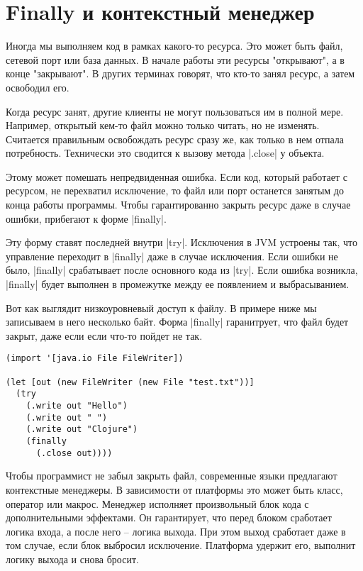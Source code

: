 \section{Finally и контекстный менеджер}

Иногда мы выполняем код в рамках какого-то ресурса. Это может быть файл, сетевой
порт или база данных. В начале работы эти ресурсы "открывают", а в конце
"закрывают". В других терминах говорят, что кто-то занял ресурс, а затем
освободил его.

Когда ресурс занят, другие клиенты не могут пользоваться им в полной
мере. Например, открытый кем-то файл можно только читать, но не
изменять. Считается правильным освобождать ресурс сразу же, как только в нем
отпала потребность. Технически это сводится к вызову метода \spverb|.close| у объекта.

Этому может помешать непредвиденная ошибка. Если код, который работает с
ресурсом, не перехватил исключение, то файл или порт останется занятым до конца
работы программы. Чтобы гарантированно закрыть ресурс даже в случае ошибки,
прибегают к форме \spverb|finally|.

Эту форму ставят последней внутри \spverb|try|. Исключения в JVM устроены так, что
управление переходит в \spverb|finally| даже в случае исключения. Если ошибки не было,
\spverb|finally| срабатывает после основного кода из \spverb|try|. Если ошибка возникла,
\spverb|finally| будет выполнен в промежутке между ее появлением и выбрасыванием.

Вот как выглядит низкоуровневый доступ к файлу. В примере ниже мы записываем в
него несколько байт. Форма \spverb|finally| гаранитрует, что файл будет закрыт, даже
если если что-то пойдет не так.

\begin{verbatim}
(import '[java.io File FileWriter])

(let [out (new FileWriter (new File "test.txt"))]
  (try
    (.write out "Hello")
    (.write out " ")
    (.write out "Clojure")
    (finally
      (.close out))))
\end{verbatim}

Чтобы программист не забыл закрыть файл, современные языки предлагают
контекстные менеджеры. В зависимости от платформы это может быть класс, оператор
или макрос. Менеджер исполняет произвольный блок кода с дополнительными
эффектами. Он гарантирует, что перед блоком сработает логика входа, а после него
-- логика выхода. При этом выход сработает даже в том случае, если блок выбросил
исключение. Платформа удержит его, выполнит логику выхода и снова бросит.

